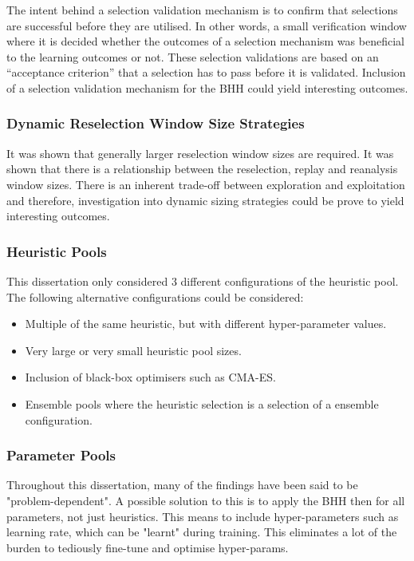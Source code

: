 The intent behind a selection validation mechanism is to confirm that selections are successful before they are utilised. In other words, a small verification window where it is decided whether the outcomes of a selection mechanism was beneficial to the learning outcomes or not. These selection validations are based on an ``acceptance criterion'' that a selection has to pass before it is validated. Inclusion of a selection validation mechanism for the \ac{BHH} could yield interesting outcomes.

\subsubsection{Dynamic Reselection Window Size Strategies}

It was shown that generally larger reselection window sizes are required. It was shown that there is a relationship between the reselection, replay and reanalysis window sizes. There is an inherent trade-off between exploration and exploitation and therefore, investigation into dynamic sizing strategies could be prove to yield interesting outcomes.

\subsubsection{Heuristic Pools}

This dissertation only considered 3 different configurations of the heuristic pool. The following alternative  configurations could be considered:

\begin{itemize}
    \item Multiple of the same heuristic, but with different hyper-parameter values.
    \item Very large or very small heuristic pool sizes.
    \item Inclusion of black-box optimisers such as CMA-ES.
    \item Ensemble pools where the heuristic selection is a selection of a ensemble configuration.
\end{itemize}

\subsubsection{Parameter Pools}

Throughout this dissertation, many of the findings have been said to be "problem-dependent". A possible solution to this is to apply the \ac{BHH} then for all parameters, not just heuristics. This means to include hyper-parameters such as learning rate, which can be "learnt" during training. This eliminates a lot of the burden to tediously fine-tune and optimise hyper-params.


